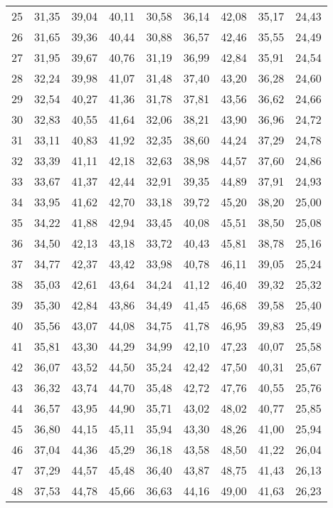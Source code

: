 \begin{longtable}{c c c c c c c c c}
25	& 31,35	& 39,04	& 40,11	& 30,58	& 36,14	& 42,08	& 35,17	& 24,43 \\
26	& 31,65	& 39,36	& 40,44	& 30,88	& 36,57	& 42,46	& 35,55	& 24,49 \\
27	& 31,95	& 39,67	& 40,76	& 31,19	& 36,99	& 42,84	& 35,91	& 24,54 \\
28	& 32,24	& 39,98	& 41,07	& 31,48	& 37,40	& 43,20	& 36,28	& 24,60 \\
29	& 32,54	& 40,27	& 41,36	& 31,78	& 37,81	& 43,56	& 36,62	& 24,66 \\
30	& 32,83	& 40,55	& 41,64	& 32,06	& 38,21	& 43,90	& 36,96	& 24,72 \\
31	& 33,11	& 40,83	& 41,92	& 32,35	& 38,60	& 44,24	& 37,29	& 24,78 \\
32	& 33,39	& 41,11	& 42,18	& 32,63	& 38,98	& 44,57	& 37,60	& 24,86 \\
33	& 33,67	& 41,37	& 42,44	& 32,91	& 39,35	& 44,89	& 37,91	& 24,93 \\
34	& 33,95	& 41,62	& 42,70	& 33,18	& 39,72	& 45,20	& 38,20	& 25,00 \\
35	& 34,22	& 41,88	& 42,94	& 33,45	& 40,08	& 45,51	& 38,50	& 25,08 \\
36	& 34,50	& 42,13	& 43,18	& 33,72	& 40,43	& 45,81	& 38,78	& 25,16 \\
37	& 34,77	& 42,37	& 43,42	& 33,98	& 40,78	& 46,11	& 39,05	& 25,24 \\
38	& 35,03	& 42,61	& 43,64	& 34,24	& 41,12	& 46,40	& 39,32	& 25,32 \\
39	& 35,30	& 42,84	& 43,86	& 34,49	& 41,45	& 46,68	& 39,58	& 25,40 \\
40	& 35,56	& 43,07	& 44,08	& 34,75	& 41,78	& 46,95	& 39,83	& 25,49 \\
41	& 35,81	& 43,30	& 44,29	& 34,99	& 42,10	& 47,23	& 40,07	& 25,58 \\
42	& 36,07	& 43,52	& 44,50	& 35,24	& 42,42	& 47,50	& 40,31	& 25,67 \\
43	& 36,32	& 43,74	& 44,70	& 35,48	& 42,72	& 47,76	& 40,55	& 25,76 \\
44	& 36,57	& 43,95	& 44,90	& 35,71	& 43,02	& 48,02	& 40,77	& 25,85 \\
45	& 36,80	& 44,15	& 45,11	& 35,94	& 43,30	& 48,26	& 41,00	& 25,94 \\
46	& 37,04	& 44,36	& 45,29	& 36,18	& 43,58	& 48,50	& 41,22	& 26,04 \\
47	& 37,29	& 44,57	& 45,48	& 36,40	& 43,87	& 48,75	& 41,43	& 26,13 \\
48	& 37,53	& 44,78	& 45,66	& 36,63	& 44,16	& 49,00	& 41,63	& 26,23 \\

\end{longtable}
